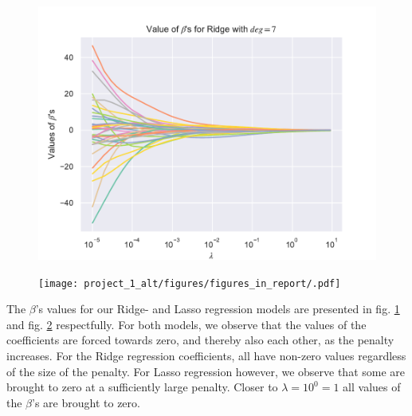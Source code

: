 \begin{figure}
    \centering
    \includegraphics[width=1\linewidth]{project_1_alt/figures/figures_in_report/Ridge_Betas_lambda_Franke_Noise_const_deg.pdf}
    \caption{}
    \label{fig:ridge_betas}
\end{figure}

\begin{figure}
    \centering
    \texttt{[image: project\_1\_alt/figures/figures\_in\_report/.pdf]}
    \caption{}
    \label{fig:lasso_betas}
\end{figure}

The $\beta$'s values for our Ridge- and Lasso regression models are presented in fig. \ref{fig:ridge_betas} and fig. \ref{fig:lasso_betas} respectfully. For both models, we observe that the values of the coefficients are forced towards zero, and thereby also each other, as the penalty increases. For the Ridge regression coefficients, all have non-zero values regardless of the size of the penalty. For Lasso regression however, we observe that some are brought to zero at a sufficiently large penalty. Closer to $\lambda = 10^0 = 1$ all values of the $\beta$'s are brought to zero. 




